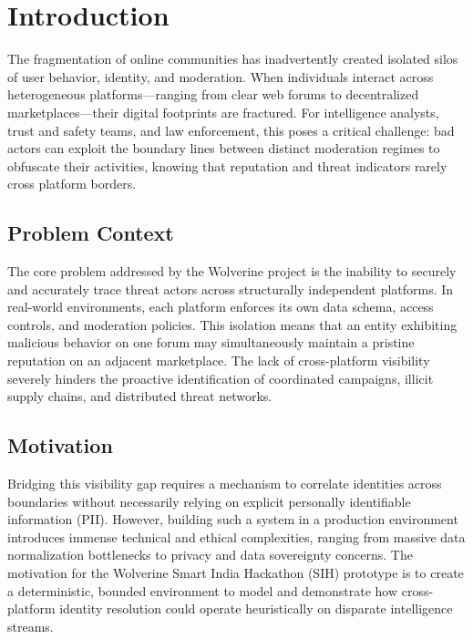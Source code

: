 \chapter{Introduction}
\label{ch:introduction}

The fragmentation of online communities has inadvertently created isolated silos of user behavior, identity, and moderation. When individuals interact across heterogeneous platforms---ranging from clear web forums to decentralized marketplaces---their digital footprints are fractured. For intelligence analysts, trust and safety teams, and law enforcement, this poses a critical challenge: bad actors can exploit the boundary lines between distinct moderation regimes to obfuscate their activities, knowing that reputation and threat indicators rarely cross platform borders.

\section{Problem Context}
\label{sec:intro-problem}
The core problem addressed by the Wolverine project is the inability to securely and accurately trace threat actors across structurally independent platforms. In real-world environments, each platform enforces its own data schema, access controls, and moderation policies. This isolation means that an entity exhibiting malicious behavior on one forum may simultaneously maintain a pristine reputation on an adjacent marketplace. The lack of cross-platform visibility severely hinders the proactive identification of coordinated campaigns, illicit supply chains, and distributed threat networks.

\section{Motivation}
\label{sec:intro-motivation}
Bridging this visibility gap requires a mechanism to correlate identities across boundaries without necessarily relying on explicit personally identifiable information (PII). However, building such a system in a production environment introduces immense technical and ethical complexities, ranging from massive data normalization bottlenecks to privacy and data sovereignty concerns. The motivation for the Wolverine Smart India Hackathon (SIH) prototype is to create a deterministic, bounded environment to model and demonstrate how cross-platform identity resolution could operate heuristically on disparate intelligence streams.

